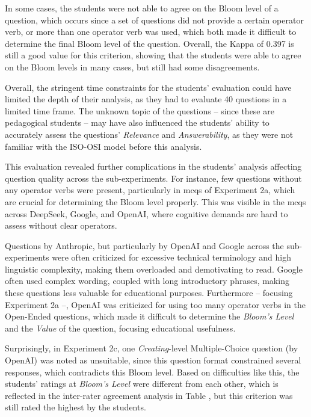 \pagebreak

In some cases, the students were not able to agree on the Bloom level of a question, which occurs since a set of questions did not provide a certain operator verb, or more than one operator verb was used, which both made it difficult to determine the final Bloom level of the question. Overall, the Kappa of 0.397 is still a good value for this criterion, showing that the students were able to agree on the Bloom levels in many cases, but still had some disagreements.

Overall, the stringent time constraints for the students' evaluation could have limited the depth of their analysis, as they had to evaluate 40 questions in a limited time frame. The unknown topic of the questions -- since these are pedagogical students -- may have also influenced the students' ability to accurately assess the questions' \textit{Relevance} and \textit{Answerability}, as they were not familiar with the ISO-OSI model before this analysis.

 This evaluation revealed further complications in the students' analysis affecting question quality across the sub-experiments. For instance, few questions without any operator verbs were present, particularly in \acp{mcq} of Experiment 2a, which are crucial for determining the Bloom level properly. This was visible in the \acp{mcq} across DeepSeek, Google, and OpenAI, where cognitive demands are hard to assess without clear operators. 

Questions by Anthropic, but particularly by OpenAI and Google across the sub-experiments were often criticized for excessive technical terminology and high linguistic complexity, making them overloaded and demotivating to read. Google often used complex wording, coupled with long introductory phrases, making these questions less valuable for educational purposes. Furthermore -- focusing Experiment 2a --, OpenAI was criticized for using too many operator verbs in the Open-Ended questions, which made it difficult to determine the \textit{Bloom's Level} and the \textit{Value} of the question, focusing educational usefulness.

Surprisingly, in Experiment 2c, one \textit{Creating}-level Multiple-Choice question (by OpenAI) was noted as unsuitable, since this question format constrained several responses, which contradicts this Bloom level. Based on difficulties like this, the students' ratings at \textit{Bloom's Level} were different from each other, which is reflected in the inter-rater agreement analysis in Table , but this criterion was still rated the highest by the students.

